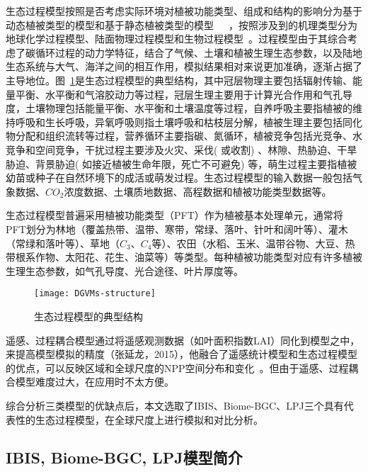 生态过程模型按照是否考虑实际环境对植被功能类型、组成和结构的影响分为基于动态植被类型的模型和基于静态植被类型的模型~\cite{王绍刚2008森林碳循环模型方法研究进展}~\cite{王萍2009基于}~\cite{毛留喜2006陆地生态系统碳循环模型研究概述}，按照涉及到的机理类型分为地球化学过程模型、陆面物理过程模型和生物过程模型~\cite{谢馨瑶2018大尺度森林碳循环过程模拟模型综述}。过程模型由于其综合考虑了碳循环过程的动力学特征，结合了气候、土壤和植被生理生态参数，以及陆地生态系统与大气、海洋之间的相互作用，模拟结果相对来说更加准确，逐渐占据了主导地位。图~\ref{fig:DGVMs-structure}是生态过程模型的典型结构，其中冠层物理主要包括辐射传输、能量平衡、水平衡和气溶胶动力等过程，冠层生理主要用于计算光合作用和气孔导度，土壤物理包括能量平衡、水平衡和土壤温度等过程，自养呼吸主要指植被的维持呼吸和生长呼吸，异氧呼吸则指土壤呼吸和枯枝层分解，植被生理主要包括同化物分配和组织流转等过程，营养循环主要指碳、氮循环，植被竞争包括光竞争、水竞争和空间竞争，干扰过程主要涉及火灾、采伐( 或收割) 、林隙、热胁迫、干旱胁迫、背景胁迫( 如接近植被生命年限，死亡不可避免) 等，萌生过程主要指植被幼苗或种子在自然环境下的成活或萌发过程。生态过程模型的输入数据一般包括气象数据、$CO_2$浓度数据、土壤质地数据、高程数据和植被功能类型数据等。

生态过程模型普遍采用植被功能类型（PFT）作为植被基本处理单元，通常将PFT划分为林地（覆盖热带、温带、寒带，常绿、落叶、针叶和阔叶等）、灌木（常绿和落叶等）、草地（$C_3$、$C_4$等）、农田（水稻、玉米、温带谷物、大豆、热带根系作物、太阳花、花生、油菜等）等类型。每种植被功能类型对应有许多植被生理生态参数，如气孔导度、光合途径、叶片厚度等。

\begin{figure}[!htbp]
    \centering
    \texttt{[image: DGVMs-structure]}
    \caption{生态过程模型的典型结构}
    \label{fig:DGVMs-structure}
\end{figure}

遥感、过程耦合模型通过将遥感观测数据（如叶面积指数LAI）同化到模型之中，来提高模型模拟的精度（张延龙，2015），他融合了遥感统计模型和生态过程模型的优点，可以反映区域和全球尺度的NPP空间分布和变化~\cite{朱文泉2005陆地植被净初级生产力计算模型研究进展}。但由于遥感、过程耦合模型难度过大，在应用时不太方便。

综合分析三类模型的优缺点后，本文选取了IBIS、Biome-BGC、LPJ三个具有代表性的生态过程模型，在全球尺度上进行模拟和对比分析。

\subsection{IBIS, Biome-BGC, LPJ模型简介}
